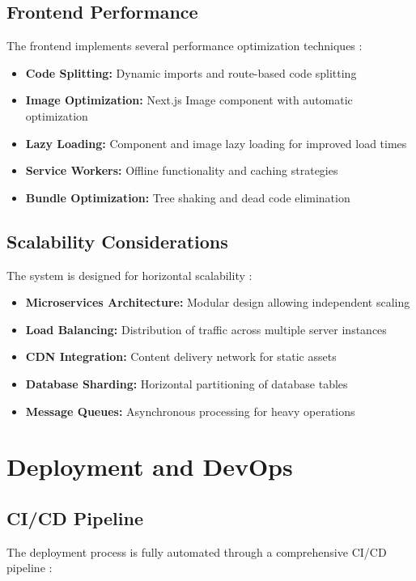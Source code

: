 \documentclass[conference]{IEEEtran}
\begin{document}
\subsection{Frontend Performance}
The frontend implements several performance optimization techniques \cite{performance_optimization}:

\begin{itemize}
    \item \textbf{Code Splitting:} Dynamic imports and route-based code splitting
    \item \textbf{Image Optimization:} Next.js Image component with automatic optimization
    \item \textbf{Lazy Loading:} Component and image lazy loading for improved load times
    \item \textbf{Service Workers:} Offline functionality and caching strategies
    \item \textbf{Bundle Optimization:} Tree shaking and dead code elimination
\end{itemize}

\subsection{Scalability Considerations}
The system is designed for horizontal scalability \cite{scalability_patterns}:

\begin{itemize}
    \item \textbf{Microservices Architecture:} Modular design allowing independent scaling
    \item \textbf{Load Balancing:} Distribution of traffic across multiple server instances
    \item \textbf{CDN Integration:} Content delivery network for static assets
    \item \textbf{Database Sharding:} Horizontal partitioning of database tables
    \item \textbf{Message Queues:} Asynchronous processing for heavy operations
\end{itemize}

\section{Deployment and DevOps}
\subsection{CI/CD Pipeline}
The deployment process is fully automated through a comprehensive CI/CD pipeline \cite{devops_practices}:
\end{document}
